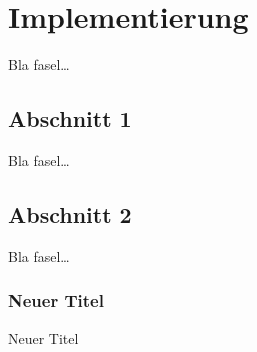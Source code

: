 
\chapter{Implementierung}
\label{ch:Implementierung}
Bla fasel\ldots

\section{Abschnitt 1}
\label{ch:Implementierung:sec:Abschnitt1}

Bla fasel\ldots

\section{Abschnitt 2}
\label{ch:Implementierung:sec:Abschnitt2}

Bla fasel\ldots

\subsection{Neuer Titel}
\label{ch:Implementierung:sec:Abschnitt2:subsec:NeuerTitel}
Neuer Titel 


